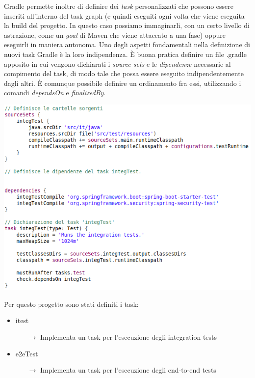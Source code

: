 \pagebreak
Gradle permette inoltre di definire dei \textsl{task} personalizzati che possono essere inseriti all'interno del task graph (e quindi eseguiti ogni volta che viene eseguita la build del progetto. In questo caso possiamo immaginarli, con un certo livello di astrazione, come un \textsl{goal} di Maven che viene attaccato a una fase) oppure eseguirli in maniera autonoma.\newline\newline
Uno degli aspetti fondamentali nella definizione di nuovi task Gradle è la loro indipendenza. È buona pratica definire un file .gradle apposito in cui vengono dichiarati i \textsl{source sets} e le \textsl{dipendenze} necessarie al compimento del task, di modo tale che possa essere eseguito indipendentemente dagli altri.
È comunque possibile definire un ordinamento fra essi, utilizzando i comandi \textsl{dependsOn} e \textsl{finalizedBy}.\newline\newline
\vspace{1cm}
\begin{minipage}{\linewidth}
	\includegraphics[width=\textwidth]{img/itest-gradle.png}
\end{minipage}
\newline\newline

Per questo progetto sono stati definiti i task:

\begin{itemize}
	\item itest
		\begin{itemize}
			\item[$\rightarrow$] Implementa un task per l'esecuzione degli integration tests
		\end{itemize}
	\item e2eTest
	\begin{itemize}
		\item[$\rightarrow$] Implementa un task per l'esecuzione degli end-to-end tests
	\end{itemize}
\end{itemize}

